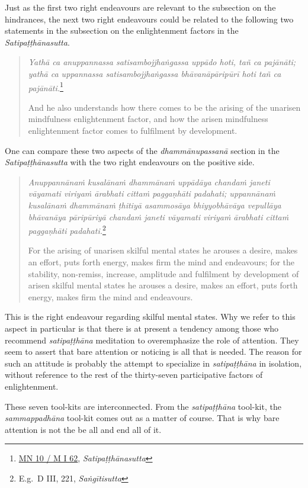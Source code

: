 Just as the first two right endeavours are relevant to the subsection on the hindrances, the next two right endeavours could be related to the following two statements in the subsection on the enlightenment factors in the \emph{Satipaṭṭhānasutta}.

\begin{quote}
\emph{Yathā ca anuppannassa satisambojjhaṅgassa uppādo hoti, tañ ca pajānāti; yathā ca uppannassa satisambojjhaṅgassa bhāvanāpāripūrī hoti tañ ca pajānāti.}\footnote{\href{https://suttacentral.net/mn10/pli/ms}{MN 10 / M I 62}, \emph{Satipaṭṭhānasutta}}

And he also understands how there comes to be the arising of the unarisen mindfulness enlightenment factor, and how the arisen mindfulness enlightenment factor comes to fulfilment by development.
\end{quote}

One can compare these two aspects of the \emph{dhammānupassanā} section in the \emph{Satipaṭṭhānasutta} with the two right endeavours on the positive side.

\begin{quote}
\emph{Anuppannānaṁ kusalānaṁ dhammānaṁ uppādāya chandaṁ janeti vāyamati viriyaṁ ārabhati cittaṁ paggaṇhāti padahati; uppannānaṁ kusalānaṁ dhammānaṁ ṭhitiyā asammosāya bhiyyobhāvāya vepullāya bhāvanāya pāripūriyā chandaṁ janeti vāyamati viriyaṁ ārabhati cittaṁ paggaṇhāti padahati.}\footnote{E.g.~D III, 221, \emph{Saṅgītisutta}}

For the arising of unarisen skilful mental states he arouses a desire, makes an effort, puts forth energy, makes firm the mind and endeavours; for the stability, non-remiss, increase, amplitude and fulfilment by development of arisen skilful mental states he arouses a desire, makes an effort, puts forth energy, makes firm the mind and endeavours.
\end{quote}

This is the right endeavour regarding skilful mental states. Why we refer to this aspect in particular is that there is at present a tendency among those who recommend \emph{satipaṭṭhāna} meditation to overemphasize the role of attention. They seem to assert that bare attention or noticing is all that is needed. The reason for such an attitude is probably the attempt to specialize in \emph{satipaṭṭhāna} in isolation, without reference to the rest of the thirty-seven participative factors of enlightenment.

These seven tool-kits are interconnected. From the \emph{satipaṭṭhāna} tool-kit, the \emph{sammappadhāna} tool-kit comes out as a matter of course. That is why bare attention is not the be all and end all of it.

